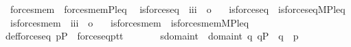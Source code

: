 \begin{isabellebody}
\ \ {\isachardoublequoteopen}forces{\isacharunderscore}{\kern0pt}mem\ {\isasymequiv}\ forces{\isacharunderscore}{\kern0pt}mem{\isacharprime}{\kern0pt}{\isacharparenleft}{\kern0pt}P{\isacharcomma}{\kern0pt}leq{\isacharparenright}{\kern0pt}{\isachardoublequoteclose}\isanewline
\isanewline
\isanewline
{}\isamarkupfalse%
\isanewline
\ \ is{\isacharunderscore}{\kern0pt}forces{\isacharunderscore}{\kern0pt}eq\ {\isacharcolon}{\kern0pt}{\isacharcolon}{\kern0pt}\ {\isachardoublequoteopen}{\isacharbrackleft}{\kern0pt}i{\isacharcomma}{\kern0pt}i{\isacharcomma}{\kern0pt}i{\isacharbrackright}{\kern0pt}\ {\isasymRightarrow}\ o{\isachardoublequoteclose}\ \isanewline
\ \ {\isachardoublequoteopen}is{\isacharunderscore}{\kern0pt}forces{\isacharunderscore}{\kern0pt}eq\ {\isasymequiv}\ is{\isacharunderscore}{\kern0pt}forces{\isacharunderscore}{\kern0pt}eq{\isacharprime}{\kern0pt}{\isacharparenleft}{\kern0pt}{\isacharhash}{\kern0pt}{\isacharhash}{\kern0pt}M{\isacharcomma}{\kern0pt}P{\isacharcomma}{\kern0pt}leq{\isacharparenright}{\kern0pt}{\isachardoublequoteclose}\isanewline
\isanewline
\isanewline
{}\isamarkupfalse%
\isanewline
\ \ is{\isacharunderscore}{\kern0pt}forces{\isacharunderscore}{\kern0pt}mem\ {\isacharcolon}{\kern0pt}{\isacharcolon}{\kern0pt}\ {\isachardoublequoteopen}{\isacharbrackleft}{\kern0pt}i{\isacharcomma}{\kern0pt}i{\isacharcomma}{\kern0pt}i{\isacharbrackright}{\kern0pt}\ {\isasymRightarrow}\ o{\isachardoublequoteclose}\ \isanewline
\ \ {\isachardoublequoteopen}is{\isacharunderscore}{\kern0pt}forces{\isacharunderscore}{\kern0pt}mem\ {\isasymequiv}\ is{\isacharunderscore}{\kern0pt}forces{\isacharunderscore}{\kern0pt}mem{\isacharprime}{\kern0pt}{\isacharparenleft}{\kern0pt}{\isacharhash}{\kern0pt}{\isacharhash}{\kern0pt}M{\isacharcomma}{\kern0pt}P{\isacharcomma}{\kern0pt}leq{\isacharparenright}{\kern0pt}{\isachardoublequoteclose}\isanewline
\isanewline
\isanewline
{}\isamarkupfalse%
\ def{\isacharunderscore}{\kern0pt}forces{\isacharunderscore}{\kern0pt}eq{\isacharcolon}{\kern0pt}\ {\isachardoublequoteopen}p{\isasymin}P\ {\isasymLongrightarrow}\ forces{\isacharunderscore}{\kern0pt}eq{\isacharparenleft}{\kern0pt}p{\isacharcomma}{\kern0pt}t{}{\isacharcomma}{\kern0pt}t{}{\isacharparenright}{\kern0pt}\ {\isasymlongleftrightarrow}\isanewline
\ \ \ \ \ \ {\isacharparenleft}{\kern0pt}{\isasymforall}s{\isasymin}domain{\isacharparenleft}{\kern0pt}t{}{\isacharparenright}{\kern0pt}\ {\isasymunion}\ domain{\isacharparenleft}{\kern0pt}t{}{\isacharparenright}{\kern0pt}{\isachardot}{\kern0pt}\ {\isasymforall}q{\isachardot}{\kern0pt}\ q{\isasymin}P\ {\isasymand}\ q\ {\isasympreceq}\ p\ {\isasymlongrightarrow}\isanewline

\end{isabellebody}

